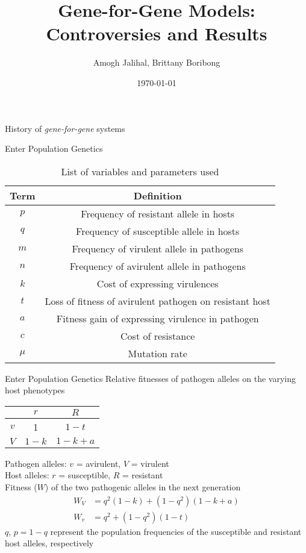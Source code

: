\documentclass[presentation]{beamer}
\author{Amogh Jalihal, Brittany Boribong}
\date{\today}
\title{Gene-for-Gene Models: Controversies and Results}
\begin{document}
\begin{frame}[label=sec-1]{History of \emph{gene-for-gene} systems}
\end{frame}

\begin{frame}[label=sec-2]{Enter Population Genetics}
\begin{table}[h!]
\centering
\begin{tabular}{|c|c|}
\hline
\textbf{Term} & \textbf{Definition} \\
\hline
$p$ & Frequency of resistant allele in hosts \\
$q$ & Frequency of susceptible allele in hosts \\
$m$ & Frequency of virulent allele in pathogens\\
$n$ & Frequency of avirulent allele in pathogens\\
$k$ & Cost of expressing virulences\\
$t$ & Loss of fitness of avirulent pathogen on resistant host\\
$a$ & Fitness gain of expressing virulence in pathogen\\
$c$ & Cost of resistance\\
$\mu$ & Mutation rate\\
\hline
\end{tabular}
\caption{List of variables and parameters used}
\label{tab:parlist}
\end{table}
\end{frame}
\begin{frame}{Enter Population Genetics}
Relative fitnesses of pathogen alleles on the varying host phenotypes
\begin{center}
\begin{tabular}{c|c|c}
& \textbf{$r$} & \textbf{$R$}\\
\hline
$v$ & 1 & $1-t$\\
$V$ & $1-k$ & $1-k+a$\\
\end{tabular}
\end{center}
Pathogen alleles: $v$ = avirulent, $V$ = virulent \\
Host alleles: $r$ = susceptible, $R$ = resistant \\
\pause
Fitness ($W$) of the two pathogenic alleles in the next generation
\begin{align}
W_V&=q^2(1-k)+(1-q^2)(1-k+a) \label{eq:fitV} \\
W_v&=q^2 + (1-q^2)(1-t) \label{eq:fitv}
\end{align}
$q$, $p=1-q$ represent the population frequencies of the susceptible and resistant host alleles, respectively
\end{frame}
\end{document}
